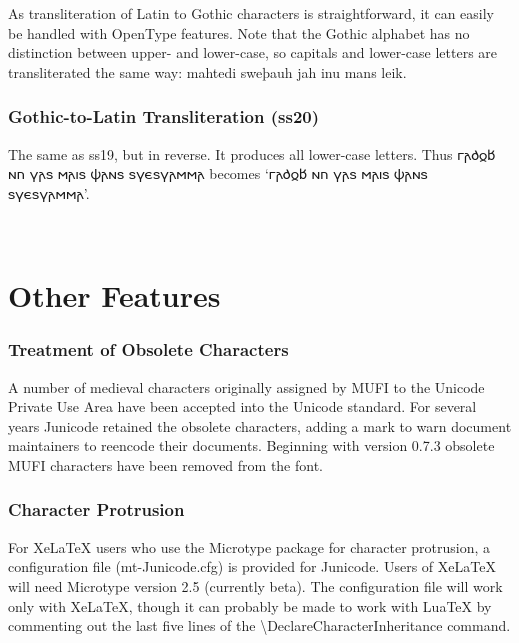 \documentclass[12pt,a4paper,openany]{book}
\begin{document}
As transliteration of Latin to Gothic characters is straightforward,
it can easily be handled with OpenType features. Note that the Gothic
alphabet has no distinction between upper- and lower-case, so capitals
and lower-case letters are transliterated the same way:
{ mahtedi sweþauh jah inu mans leik}.

\subsection*{Gothic-to-Latin Transliteration (ss20)}

The same as ss19, but in reverse. It produces all lower-case
letters. Thus 𐌲𐌰𐌳𐍉𐌱 𐌽𐌿 𐍅𐌰𐍃 𐌼𐌰𐌹𐍃 𐌸𐌰𐌽𐍃 𐍃𐍅𐌴𐍃𐍅𐌰𐌼𐌼𐌰
becomes ‘{𐌲𐌰𐌳𐍉𐌱 𐌽𐌿 𐍅𐌰𐍃 𐌼𐌰𐌹𐍃 𐌸𐌰𐌽𐍃 𐍃𐍅𐌴𐍃𐍅𐌰𐌼𐌼𐌰}’.

\begin{center}
\huge {\color{myRed}}
\end{center}

\chapter*{\color{myBlue}Other Features}

\subsection*{Treatment of Obsolete Characters}

A number of medieval characters originally assigned by MUFI to the
Unicode Private Use Area have been accepted into the Unicode
standard. For several years Junicode retained the obsolete
characters, adding a mark to warn document maintainers to reencode
their documents. Beginning with version 0.7.3 obsolete MUFI characters
have been removed from the font.

\subsection*{Character Protrusion}

For XeLaTeX users who use the Microtype package for
character protrusion, a
configuration file (mt-Junicode.cfg) is provided for Junicode. Users
of XeLaTeX will need Microtype version 2.5 (currently beta). The
configuration file will work only with XeLaTeX, though it can probably be made
to work with LuaTeX by commenting out the last five lines of the
{\textbackslash}DeclareCharacterInheritance command.
\end{document}
